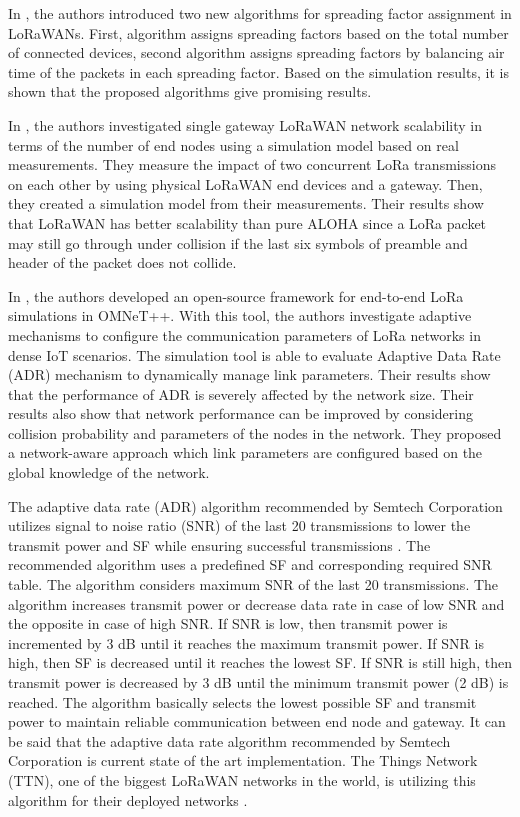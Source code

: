 In \cite{8115779}, the authors introduced two new algorithms for spreading factor assignment in LoRaWANs. First, algorithm assigns spreading factors based on the total number of connected devices, second algorithm assigns spreading factors by balancing air time of the packets in each spreading factor. Based on the simulation results, it is shown that the proposed algorithms give promising results.

In \cite{s17061193}, the authors investigated single gateway LoRaWAN network scalability in terms of the number of end nodes using a simulation model based on real measurements. They measure the impact of two concurrent LoRa transmissions on each other by using physical LoRaWAN end devices and a gateway. Then, they created a simulation model from their measurements. Their results show that LoRaWAN has better scalability than pure ALOHA since a LoRa packet may still go through under collision if the last six symbols of preamble and header of the packet does not collide.

In \cite{8406255}, the authors developed an open-source framework for end-to-end LoRa simulations in OMNeT++. With this tool, the authors investigate adaptive mechanisms to configure the communication parameters of LoRa networks in dense IoT scenarios. The simulation tool is able to evaluate Adaptive Data Rate (ADR) mechanism to dynamically manage link parameters. Their results show that the performance of ADR is severely affected by the network size. Their results also show that network performance can be improved by considering collision probability and parameters of the nodes in the network. They proposed a network-aware approach which link parameters are configured based on the global knowledge of the network.

The adaptive data rate (ADR) algorithm recommended by Semtech Corporation utilizes signal to noise ratio (SNR) of the last 20 transmissions to lower the transmit power and SF while ensuring successful transmissions \cite{lorawan_adr}. The recommended algorithm uses a predefined SF and corresponding required SNR table. The algorithm considers maximum SNR of the last 20 transmissions. The algorithm increases transmit power or decrease data rate in case of low SNR and the opposite in case of high SNR. If SNR is low, then transmit power is incremented by 3 dB until it reaches the maximum transmit power. If SNR is high, then SF is decreased until it reaches the lowest SF. If SNR is still high, then transmit power is decreased by 3 dB until the minimum transmit power (2 dB) is reached. The algorithm basically selects the lowest possible SF and transmit power to maintain reliable communication between end node and gateway. It can be said that the adaptive data rate algorithm recommended by Semtech Corporation is current state of the art implementation. The Things Network (TTN), one of the biggest LoRaWAN networks in the world, is utilizing this algorithm for their deployed networks \cite{ttn_adr}.
